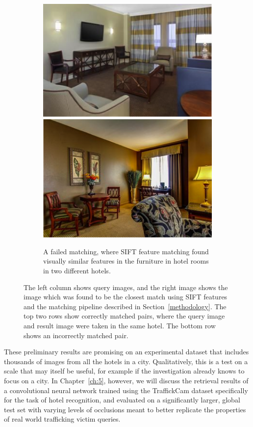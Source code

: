 \begin{figure}[p]
\begin{center}
  \begin{subfigure}[b]{.9\textwidth}
    \includegraphics[width=.5\columnwidth]{figures/chapter3/bad1a.png}
    \includegraphics[width=.5\columnwidth]{figures/chapter3/bad1b.png}
    \caption{A failed matching, where SIFT feature matching found visually similar features in the furniture in hotel rooms in two different hotels.}
  \end{subfigure}
  
  \caption{The left column shows query images, and the right image shows the image which was found to be the closest match using SIFT features and the matching pipeline described in Section~\ref{methodology}. The top two rows show correctly matched pairs, where the query image and result image were taken in the same hotel. The bottom row shows an incorrectly matched pair.}
  \label{results}
  \end{center}
\end{figure}

These preliminary results are promising on an experimental dataset that includes thousands of images from all the hotels in a city.  Qualitatively, this is a test on a scale that may itself be useful, for example if the investigation already knows to focus on a city. In Chapter~\ref{ch:5}, however, we will discuss the retrieval results of a convolutional neural network trained using the TraffickCam dataset specifically for the task of hotel recognition, and evaluated on a significantly larger, global test set with varying levels of occlusions meant to better replicate the properties of real world trafficking victim queries.